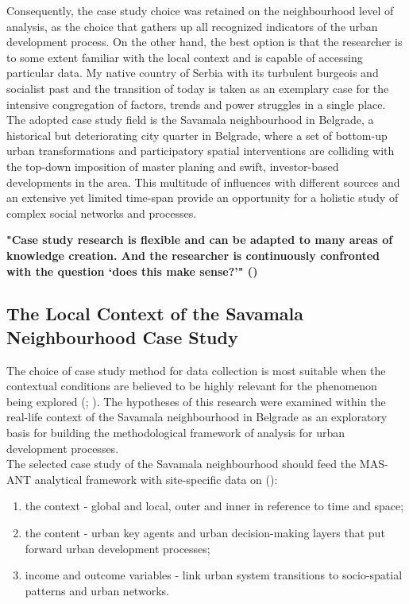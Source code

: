 \documentclass[11pt]{report}
\begin{document}
Consequently, the case study choice was retained on the neighbourhood level of analysis, as the choice that gathers up all recognized indicators of the urban development process. On the other hand, the best option is that the researcher is to some extent familiar with the local context and is capable of accessing particular data. My native country of Serbia with its turbulent burgeois and socialist past and the transition of today is taken as an exemplary case for the intensive congregation of factors, trends and power struggles in a single place. The adopted case study field is the Savamala neighbourhood in Belgrade, a historical but deteriorating city quarter in Belgrade, where a set of bottom-up urban transformations and participatory spatial interventions are colliding with the top-down imposition of master planing and swift, investor-based developments in the area. This multitude of influences with different sources and an extensive yet limited time-span provide an opportunity for a holistic study of complex social networks and processes.

\textbf{"Case study research is flexible and can be adapted to many areas of knowledge creation. And the researcher is continuously confronted with the question ‘does this make sense?’" (\href{Harrison}{\citealt{partington_case_2002}})}

\subsection{The Local Context of the Savamala Neighbourhood Case Study}

The choice of case study method for data collection is most suitable when the  contextual  conditions  are  believed  to  be highly relevant for the phenomenon being explored (\href{Robson}{\citealt{robson_real_1993}}; \href{Yin}{\citealt{yin_case_2003}}). The hypotheses of this research were examined within the real-life context of the Savamala neighbourhood in Belgrade as an exploratory basis for building the methodological framework of analysis for urban development processes. 
\\

The selected case study of the Savamala neighbourhood should feed the MAS-ANT analytical framework with site-specific data on (\href{Harrison}{\citealt{partington_case_2002}}):
\begin{enumerate}
\item the context - global and local, outer and inner in reference to time and space;
\item the content - urban key agents and urban decision-making layers that put forward urban development processes;
\item income and outcome variables - link urban system transitions to socio-spatial patterns and urban networks.
\end{enumerate}
\end{document}
